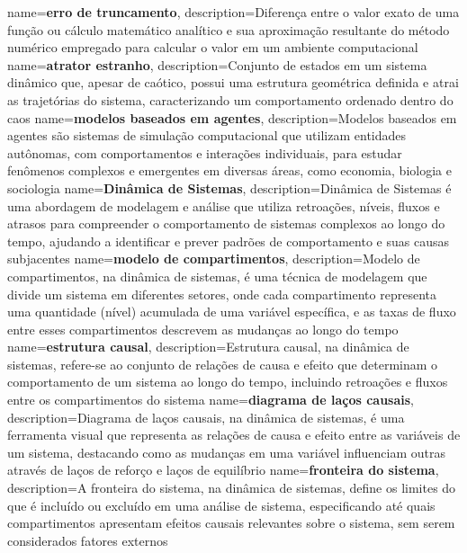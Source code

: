 {
    name=\textbf{erro de truncamento},
    description={Diferença entre o valor exato de uma função ou cálculo matemático analítico e sua aproximação resultante do método numérico empregado para calcular o valor em um ambiente computacional}
}
{
    name=\textbf{atrator estranho},
    description={Conjunto de estados em um sistema dinâmico que, apesar de caótico, possui uma estrutura geométrica definida e atrai as trajetórias do sistema, caracterizando um comportamento ordenado dentro do caos}
}
{
    name=\textbf{modelos baseados em agentes},
    description={Modelos baseados em agentes são sistemas de simulação computacional que utilizam entidades autônomas, com comportamentos e interações individuais, para estudar fenômenos complexos e emergentes em diversas áreas, como economia, biologia e sociologia}
}
{
    name=\textbf{Dinâmica de Sistemas},
    description={Dinâmica de Sistemas é uma abordagem de modelagem e análise que utiliza retroações, níveis, fluxos e atrasos para compreender o comportamento de sistemas complexos ao longo do tempo, ajudando a identificar e prever padrões de comportamento e suas causas subjacentes}
}
{
    name=\textbf{modelo de compartimentos},
    description={Modelo de compartimentos, na dinâmica de sistemas, é uma técnica de modelagem que divide um sistema em diferentes setores, onde cada compartimento representa uma quantidade (nível) acumulada de uma variável específica, e as taxas de fluxo entre esses compartimentos descrevem as mudanças ao longo do tempo}
}
{
    name=\textbf{estrutura causal},
    description={Estrutura causal, na dinâmica de sistemas, refere-se ao conjunto de relações de causa e efeito que determinam o comportamento de um sistema ao longo do tempo, incluindo retroações e fluxos entre os compartimentos do sistema}
}
{
    name=\textbf{diagrama de laços causais},
    description={Diagrama de laços causais, na dinâmica de sistemas, é uma ferramenta visual que representa as relações de causa e efeito entre as variáveis de um sistema, destacando como as mudanças em uma variável influenciam outras através de laços de reforço e laços de equilíbrio}
}
{
    name=\textbf{fronteira do sistema},
    description={A fronteira do sistema, na dinâmica de sistemas, define os limites do que é incluído ou excluído em uma análise de sistema, especificando até quais compartimentos apresentam efeitos causais relevantes sobre o sistema, sem serem considerados fatores externos}
}
